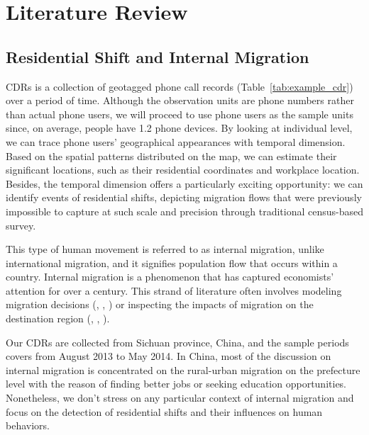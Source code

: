 \chapter{Literature Review}
\section{Residential Shift and Internal Migration}\label{sec:2_residential_shift_and_internal_migration}
CDRs is a collection of geotagged phone call records (Table~\ref{tab:example_cdr}) over a period of time.
Although the observation units are phone numbers rather than actual phone users, we will proceed to use phone users as the sample units since, on average, people have 1.2 phone devices.
By looking at individual level, we can trace phone users' geographical appearances with temporal dimension.
Based on the spatial patterns distributed on the map, we can estimate their significant locations, such as their residential coordinates and workplace location.
Besides, the temporal dimension offers a particularly exciting opportunity: we can identify events of residential shifts, depicting migration flows that were previously impossible to capture at such scale and precision through traditional census-based survey.


This type of human movement is referred to as internal migration, unlike international migration, and it signifies population flow that occurs within a country.
Internal migration is a phenomenon that has captured economists' attention for over a century.
This strand of literature often involves modeling migration decisions (\cite{hunt2004north}, \cite{espindola2006harris}, \cite{wang2023job}) or inspecting the impacts of migration on the destination region (\cite{boustan2010effect}, \cite{bryan2019aggregate}, \cite{imbert2022migrants}).

Our CDRs are collected from Sichuan province, China, and the sample periods covers from August 2013 to May 2014. In China, most of the discussion on internal migration is concentrated on the rural-urban migration on the prefecture level with the reason of finding better jobs or seeking education opportunities. Nonetheless, we don't stress on any particular context of internal migration and focus on the detection of residential shifts and their influences on human behaviors.

